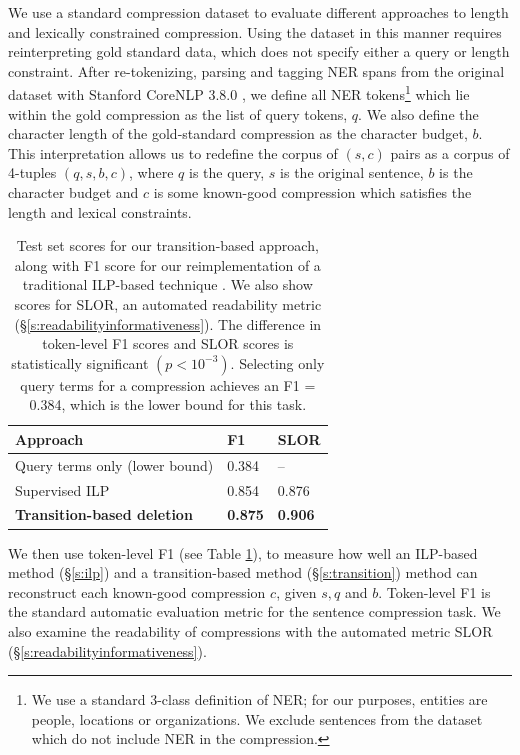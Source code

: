\documentclass[11pt,a4paper]{article}
\begin{document}
We use a standard compression dataset \citet{filippova2013overcoming} to evaluate different approaches to length and lexically constrained compression. Using the dataset in this manner requires reinterpreting gold standard data, which does not specify either a query or length constraint. After re-tokenizing, parsing and tagging NER spans from the original dataset with Stanford CoreNLP 3.8.0 \cite{corenlp}, we define all NER tokens\footnote{We use a standard 3-class definition of NER; for our purposes, entities are people, locations or organizations. We exclude sentences from the dataset which do not include NER in the compression.} which lie within the gold compression as the list of query tokens, $q$. We also define the character length of the gold-standard compression as the character budget, $b$. This interpretation allows us to redefine the corpus of $(s,c)$ pairs as a corpus of 4-tuples $(q,s,b,c)$, where $q$ is the query, $s$ is the original sentence, $b$ is the character budget and $c$ is some known-good compression which satisfies the length and lexical constraints. 

\begin{table}[]
\begin{tabular}{lll}
\centering
Approach & F1 & SLOR  \\ \hline
Query terms only {\small (lower bound)} & 0.384  & --   \\
Supervised ILP  &  0.854   &  0.876        \\
\textbf{Transition-based deletion} &  \textbf{0.875}  & \textbf{0.906}   \\
\end{tabular}
\caption{Test set scores for our transition-based approach, along with F1 score for our reimplementation of a traditional ILP-based technique \cite{filippova2013overcoming}. We also show scores for SLOR, an automated readability metric (\S\ref{s:readabilityinformativeness}). The difference in token-level F1 scores and SLOR scores is statistically significant {\small $(p < 10^{-3})$}. Selecting only query terms for a compression achieves an F1 = 0.384, which is the lower bound for this task.}
\label{t:results}
\end{table}


We then use token-level F1 (see Table \ref{t:results}), to measure how well an ILP-based method (\S\ref{s:ilp}) and a transition-based method (\S\ref{s:transition}) method can reconstruct each known-good compression $c$, given $s,q$ and $b$. Token-level F1 is the standard automatic evaluation metric for the sentence compression task. We also examine the readability of compressions with the automated metric SLOR (\S\ref{s:readabilityinformativeness}). 
\end{document}
